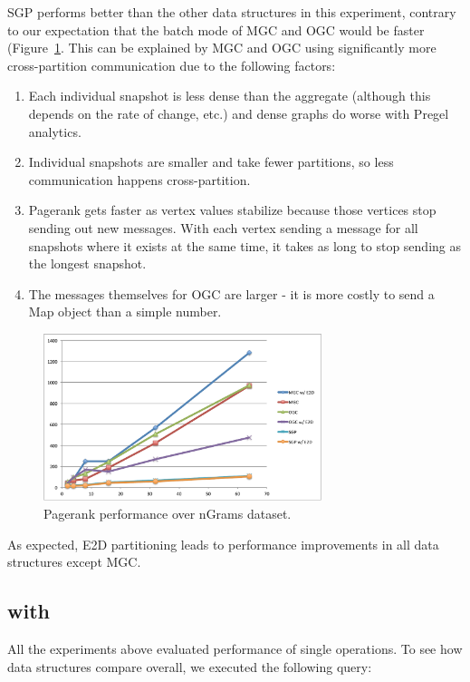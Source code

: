 SGP performs better than the other data structures in this experiment,
contrary to our expectation that the batch mode of MGC and OGC would
be faster (Figure~\ref{fig:pagerank}.  This can be explained by MGC
and OGC using significantly more cross-partition communication due to
the following factors:

\begin{enumerate}[leftmargin=*]
\item Each individual snapshot is less dense than the aggregate
  (although this depends on the rate of change, etc.) and dense graphs
  do worse with Pregel analytics.
\item Individual snapshots are smaller and take fewer partitions, so
  less communication happens cross-partition.
\item Pagerank gets faster as vertex values stabilize because those
  vertices stop sending out new messages. With each vertex sending a
  message for all snapshots where it exists at the same time, it takes
  as long to stop sending as the longest snapshot.  
\item The messages themselves for OGC are larger - it is more costly
  to send a Map object than a simple number.
\end{enumerate}

\begin{figure}[t]
\includegraphics[width=3.2in]{figs/pagerank.pdf}
\caption{Pagerank performance over nGrams dataset.}
\label{fig:pagerank}
\end{figure}

As expected, E2D partitioning leads to performance improvements in all
data structures except MGC.

\subsection{ with }

All the experiments above evaluated performance of single operations.
To see how data structures compare overall, we executed the following
query:

